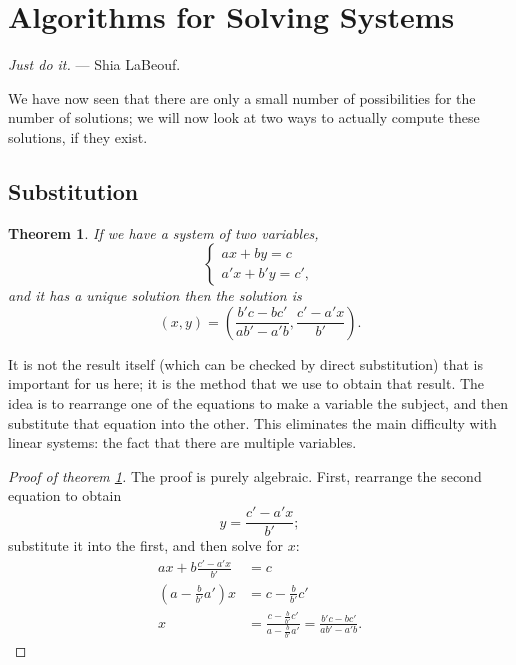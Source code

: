 \documentclass[a4paper,leqno]{article}
\numberwithin{equation}{section}
\newtheorem{thm}[equation]{Theorem}
\theoremstyle{definition}
\theoremstyle{remark}
\begin{document}
\section{Algorithms for Solving Systems}
\begin{center}
  \emph{Just do it.}  --- Shia LaBeouf.
\end{center}
We have now seen that there are only a small number of possibilities for the number of solutions; we will now look at two ways to
actually compute these solutions, if they exist.

\subsection{Substitution}
\begin{thm}\label{thm:subs2}
  If we have a system of two variables,
  \begin{equation}
    \begin{cases}
      ax + by = c\\
      a'x + b'y = c',
    \end{cases}
  \end{equation}
  and it has a unique solution then the solution is
  \begin{equation}
    (x,y) = \left(\frac{b'c - bc'}{ab' - a'b}, \frac{c' - a'x}{b'}\right).
  \end{equation}
\end{thm}

It is not the result itself (which can be checked by direct substitution) that is important for us here; it is the method that we use
to obtain that result. The idea is to rearrange one of the equations to make a variable the subject, and then substitute that equation
into the other. This eliminates the main difficulty with linear systems: the fact that there are multiple variables.
\begin{proof}[Proof of theorem \ref{thm:subs2}]
  The proof is purely algebraic. First, rearrange the second equation to obtain
  \begin{displaymath}
    y = \frac{c' - a' x}{b'};
  \end{displaymath}
  substitute it into the first, and then solve for $ x $:
  \begin{align*}
    ax + b \frac{c' - a' x}{b'} &= c\\
    \left( a - \frac{b}{b'} a' \right)x &= c - \frac{b}{b'} c'\\
    x &= \frac{c - \frac{b}{b'} c'}{a - \frac{b}{b'} a'} = \frac{b'c - bc'}{ab' - a'b}.
  \end{align*}
\end{proof}
\end{document}

